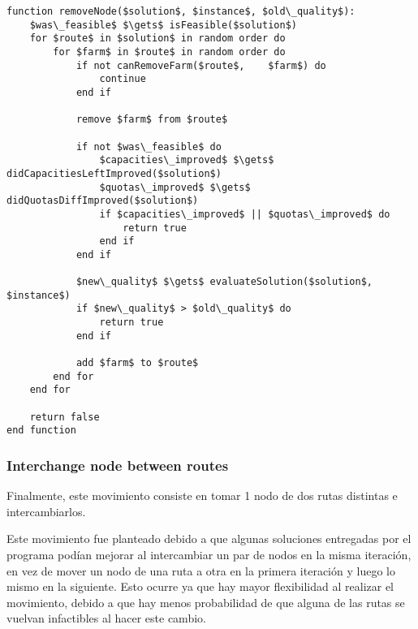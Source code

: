 \begin{lstlisting}[style=estiloPseudocodigo]
function removeNode($solution$, $instance$, $old\_quality$):
    $was\_feasible$ $\gets$ isFeasible($solution$)
    for $route$ in $solution$ in random order do
        for $farm$ in $route$ in random order do
            if not canRemoveFarm($route$,    $farm$) do
                continue
            end if

            remove $farm$ from $route$

            if not $was\_feasible$ do
                $capacities\_improved$ $\gets$ didCapacitiesLeftImproved($solution$)
                $quotas\_improved$ $\gets$ didQuotasDiffImproved($solution$)
                if $capacities\_improved$ || $quotas\_improved$ do
                    return true
                end if
            end if

            $new\_quality$ $\gets$ evaluateSolution($solution$, $instance$)
            if $new\_quality$ > $old\_quality$ do
                return true
            end if

            add $farm$ to $route$
        end for
    end for

    return false
end function
\end{lstlisting}

\subsubsection{Interchange node between routes}

Finalmente, este movimiento consiste en tomar 1 nodo de dos rutas distintas e intercambiarlos.

Este movimiento fue planteado debido a que algunas soluciones entregadas por el programa podían mejorar al intercambiar un par de nodos en la misma iteración, en vez de mover un nodo de una ruta a otra en la primera iteración y luego lo mismo en la siguiente. Esto ocurre ya que hay mayor flexibilidad al realizar el movimiento, debido a que hay menos probabilidad de que alguna de las rutas se vuelvan infactibles al hacer este cambio.

